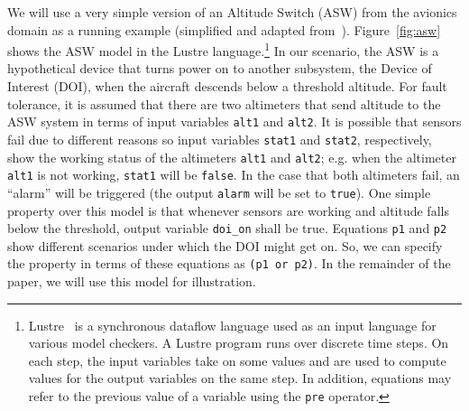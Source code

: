 We will use a very simple version of an Altitude Switch (ASW) from the avionics domain as a running example (simplified and adapted from~\cite{HCW02:ase-deviation}). 
Figure~\ref{fig:asw} shows the ASW model in the Lustre language.\footnote{Lustre~\cite{Halbwachs91:lustre} is a synchronous dataflow language
used as an input language for various model checkers. A Lustre program runs over discrete
time steps. On each step, the input variables take on some values and
are used to compute values for the output variables on the same step.
In addition, equations may refer to the previous value of a variable
using the \small{{\tt pre}} operator.} In our scenario, the ASW is a hypothetical device that turns power on to another subsystem, the Device of Interest (DOI), when the aircraft descends below a threshold altitude.
For fault tolerance, it is assumed that there are two altimeters that send altitude to the ASW system in terms of input variables \texttt{alt1} and \texttt{alt2}.
It is possible that sensors fail due to different reasons so input variables \texttt{stat1} and \texttt{stat2}, respectively, show the working status of the altimeters \texttt{alt1} and \texttt{alt2}; e.g. when the altimeter \texttt{alt1} is not working, \texttt{stat1} will be \texttt{false}. In the case that both altimeters fail, an ``alarm'' will be triggered (the output \texttt{alarm} will be set to \texttt{true}).
One simple property over this model is that whenever sensors are working and altitude falls below the threshold, output variable \texttt{doi\_on} shall be true. Equations \texttt{p1} and \texttt{p2} show different scenarios under which the DOI might get on. So, we can specify the property in terms of these equations as \texttt{(p1 or p2)}.
In the remainder of the paper, we will use this model for illustration.
